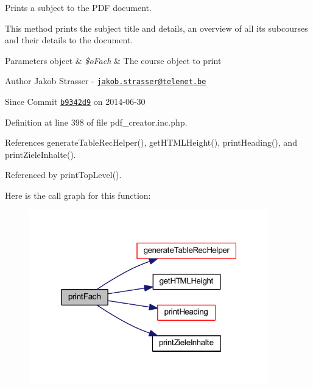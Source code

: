 Prints a subject to the P\+D\+F document. 

This method prints the subject title and details, an overview of all its subcourses and their details to the document.


\begin{DoxyParams}[1]{Parameters}
object & {\em \$o\+Fach} & The course object to print\\
\hline
\end{DoxyParams}
\begin{DoxyAuthor}{Author}
Jakob Strasser -\/ \href{mailto:jakob.strasser@telenet.be}{\tt jakob.\+strasser@telenet.\+be} 
\end{DoxyAuthor}
\begin{DoxySince}{Since}
Commit \href{http://github.com/TheJake123/DrupalModul/commit/b9342d941b3f93e212f3f6af0823a07524dd5954}{\tt b9342d9} on 2014-\/06-\/30 
\end{DoxySince}


Definition at line 398 of file pdf\+\_\+creator.\+inc.\+php.



References generate\+Table\+Rec\+Helper(), get\+H\+T\+M\+L\+Height(), print\+Heading(), and print\+Ziele\+Inhalte().



Referenced by print\+Top\+Level().



Here is the call graph for this function\+:
\nopagebreak
\begin{figure}[H]
\begin{center}
\leavevmode
\includegraphics[width=295pt]{classoverview_p_d_f_abf0674d88080affc25c472fbd0525896_cgraph}
\end{center}
\end{figure}




